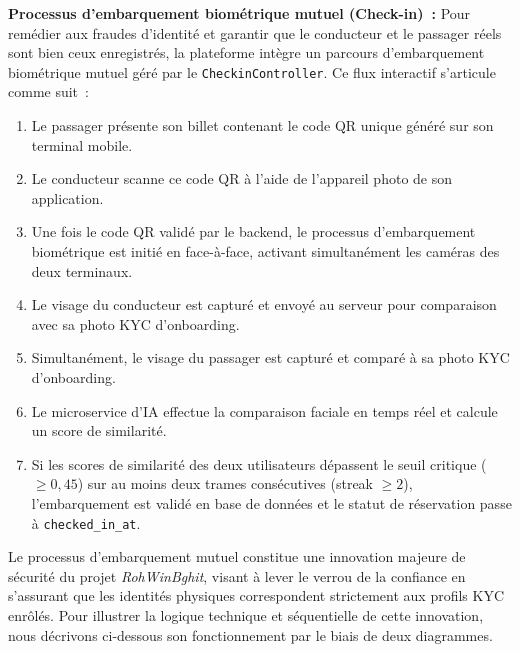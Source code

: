 \documentclass[12pt, a4paper, oneside]{report}
\begin{document}
\noindent\textbf{Processus d'embarquement biométrique mutuel (Check-in)~:}
Pour remédier aux fraudes d'identité et garantir que le conducteur et le passager réels sont bien ceux enregistrés, la plateforme intègre un parcours d'embarquement biométrique mutuel géré par le \texttt{CheckinController}. Ce flux interactif s'articule comme suit~:
\begin{enumerate}
  \item Le passager présente son billet contenant le code QR unique généré sur son terminal mobile.
  \item Le conducteur scanne ce code QR à l'aide de l'appareil photo de son application.
  \item Une fois le code QR validé par le backend, le processus d'embarquement biométrique est initié en face-à-face, activant simultanément les caméras des deux terminaux.
  \item Le visage du conducteur est capturé et envoyé au serveur pour comparaison avec sa photo KYC d'onboarding.
  \item Simultanément, le visage du passager est capturé et comparé à sa photo KYC d'onboarding.
  \item Le microservice d'IA effectue la comparaison faciale en temps réel et calcule un score de similarité.
  \item Si les scores de similarité des deux utilisateurs dépassent le seuil critique ($\ge 0{,}45$) sur au moins deux trames consécutives (streak $\ge 2$), l'embarquement est validé en base de données et le statut de réservation passe à \texttt{checked\_in\_at}.
\end{enumerate}

Le processus d'embarquement mutuel constitue une innovation majeure de sécurité du projet \textit{RohWinBghit}, visant à lever le verrou de la confiance en s'assurant que les identités physiques correspondent strictement aux profils KYC enrôlés. Pour illustrer la logique technique et séquentielle de cette innovation, nous décrivons ci-dessous son fonctionnement par le biais de deux diagrammes.
\end{document}
